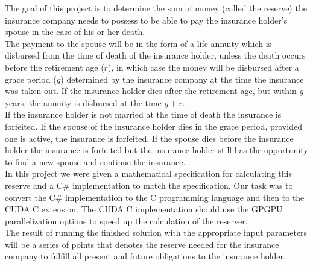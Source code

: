 
The goal of this project is to determine the sum of money (called the reserve) the insurance company needs to possess to be able to pay the insurance holder's spouse in the case of his or her death. \\

The payment to the spouse will be in the form of a life annuity which is disbursed from the time of death of the insurance holder, unless the death occurs before the retirement age ($r$), in which case the money will be disbursed after a grace period ($g$) determined by the insurance company at the time the insurance was taken out. If the insurance holder dies after the retirement age, but within $g$ years, the annuity is disbursed at the time $g + r$. \\

If the insurance holder is not married at the time of death the insurance is forfeited. If the spouse of the insurance holder dies in the grace period, provided one is active, the insurance is forfeited. If the spouse dies before the insurance holder the insurance is forfeited but the insurance holder still has the opportunity to find a new spouse and continue the insurance. \\

In this project we were given a mathematical specification for calculating this reserve \cite{edlu} and a C\# implementation to match the specification. Our task was to convert the C\# implementation to the C programming language and then to the CUDA C extension. The CUDA C implementation should use the GPGPU parallelization options to speed up the calculation of the reserver. \\

The result of running the finished solution with the appropriate input parameters will be a series of points that denotes the reserve needed for the insurance company to fulfill all present and future obligations to the insurance holder.